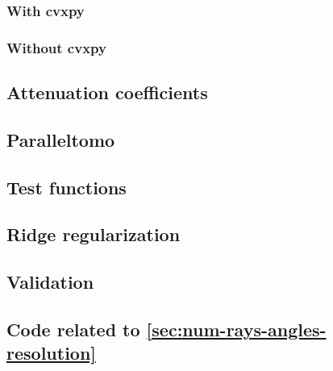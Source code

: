 \documentclass{article}
\begin{document}
\subsubsection{With cvxpy}\label{appendix:exercise-1-cvxpy}


\subsubsection{Without cvxpy}\label{appendix:exercise-1}


\subsection{Attenuation coefficients}\label{appendix:attenuation-coefficients}


\subsection{Paralleltomo}\label{appendix:paralleltomo}


\subsection{Test functions}\label{appendix:generate-test-functions}


\subsection{Ridge regularization}\label{appendix:ridge-regularization}


\subsection{Validation}\label{appendix:validation}


\subsection{Code related to \ref{sec:num-rays-angles-resolution}}\label{appendix:num-rays-angles-resolution}

\end{document}
